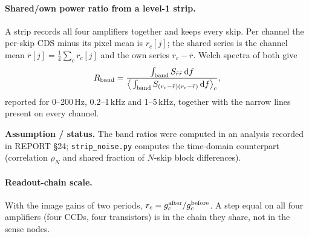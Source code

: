 \documentclass[10pt,a4paper]{article}
\newcommand{\code}[1]{\texttt{\small #1}}
\newcommand{\dd}{\,\mathrm{d}}
\newcommand{\caveat}[1]{\par\smallskip\noindent\colorbox{orange!10}{\parbox{\dimexpr\linewidth-2\fboxsep}{\small\textbf{Assumption / status.} #1}}\par\smallskip}
\begin{document}
\paragraph{Shared/own power ratio from a level-1 strip.} A strip records all four amplifiers together and keeps every
skip. Per channel the per-skip CDS minus its pixel mean is $r_c[j]$; the shared series is the channel mean
$\bar r[j]=\frac14\sum_c r_c[j]$ and the own series $r_c-\bar r$. Welch spectra of both give
\begin{equation}
R_{\rm band}=\frac{\int_{\rm band}S_{\bar r\bar r}\dd f}{\big\langle\int_{\rm band}S_{(r_c-\bar r)(r_c-\bar r)}\dd f\big\rangle_c},
\end{equation}
reported for 0--200\,Hz, 0.2--1\,kHz and 1--5\,kHz, together with the narrow lines present on every channel.
\caveat{The band ratios were computed in an analysis recorded in REPORT \S24; \code{strip\_noise.py} computes the
time-domain counterpart (correlation $\rho_N$ and shared fraction of $N$-skip block differences).}

\paragraph{Readout-chain scale.} With the image gains of two periods,
$r_c=g_c^{\rm after}/g_c^{\rm before}$. A step equal on all four amplifiers (four CCDs, four transistors) is in the
chain they share, not in the sense nodes.
\end{document}

